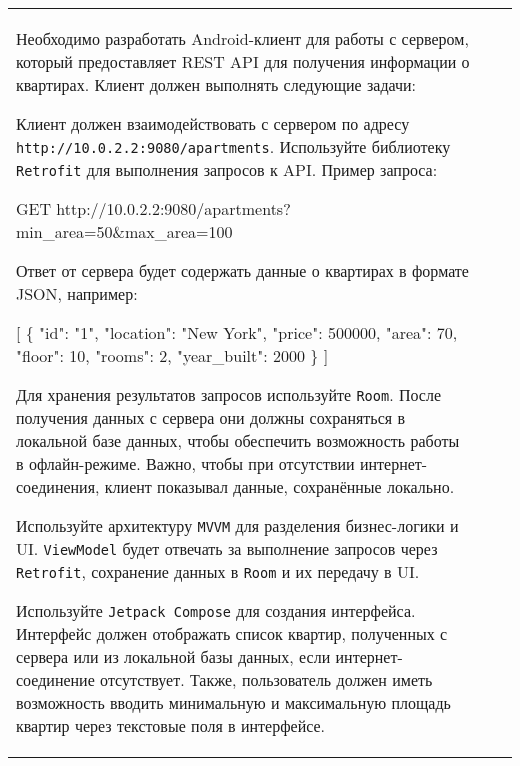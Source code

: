 \documentclass[a4paper]{article}
\begin{document}
\begin{tabular}{!{\vrule width 2pt}p{5cm}|p{6cm}|p{4cm}!{\vrule width 2pt}}
{\begin{minipage}{16cm}
\begin{enumerate}
Необходимо разработать Android-клиент для работы с сервером, который предоставляет REST API для получения информации о квартирах. Клиент должен выполнять следующие задачи:

Клиент должен взаимодействовать с сервером по адресу \texttt{http://10.0.2.2:9080/apartments}. Используйте библиотеку \texttt{Retrofit} для выполнения запросов к API. Пример запроса:


GET http://10.0.2.2:9080/apartments?min\_area=50\&max\_area=100


Ответ от сервера будет содержать данные о квартирах в формате JSON, например:


[
  \{
    "id": "1",
    "location": "New York",
    "price": 500000,
    "area": 70,
    "floor": 10,
    "rooms": 2,
    "year\_built": 2000
  \}
]


Для хранения результатов запросов используйте \texttt{Room}. После получения данных с сервера они должны сохраняться в локальной базе данных, чтобы обеспечить возможность работы в офлайн-режиме. Важно, чтобы при отсутствии интернет-соединения, клиент показывал данные, сохранённые локально.

Используйте архитектуру \texttt{MVVM} для разделения бизнес-логики и UI. \texttt{ViewModel} будет отвечать за выполнение запросов через \texttt{Retrofit}, сохранение данных в \texttt{Room} и их передачу в UI.

Используйте \texttt{Jetpack Compose} для создания интерфейса. Интерфейс должен отображать список квартир, полученных с сервера или из локальной базы данных, если интернет-соединение отсутствует. Также, пользователь должен иметь возможность вводить минимальную и максимальную площадь квартир через текстовые поля в интерфейсе.


\end{enumerate}
\end{minipage}}
\end{tabular}
\end{document}
